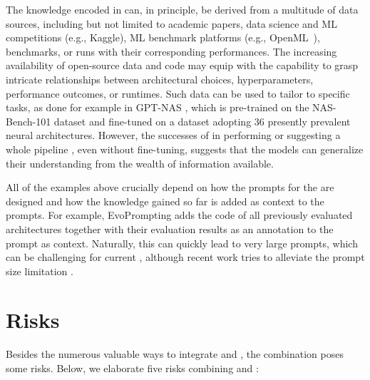 \documentclass[10pt]{article} %
\begin{document}
The knowledge encoded in \LLMs can, in principle, be derived from a multitude of data sources, including but not limited to academic papers, data science and ML competitions (e.g., Kaggle), ML benchmark platforms (e.g., OpenML~\citep{casalicchio-19a}), \AutoML benchmarks, or \AutoML runs with their corresponding performances.
The increasing availability of open-source data and code may equip \LLMs with the capability to grasp intricate relationships between architectural choices, hyperparameters, performance outcomes, or runtimes.
Such data can be used to tailor \LLMs to specific tasks, as done for example in GPT-NAS \citep{yu2023gptnas}, which is pre-trained on the NAS-Bench-101 dataset \citep{ying-icml19a} and fine-tuned on a dataset adopting 36 presently prevalent neural architectures. However, the successes of \LLMs in performing \NAS \citep{zheng2023gpt4} or suggesting a whole \AutoML pipeline \citep{zhang-arxiv23a, zhang-arxiv23b}, even without fine-tuning, suggests that the models can generalize their understanding from the wealth of information available.

All of the examples above crucially depend on how the prompts for the \LLM are designed and how the knowledge gained so far is added as context to the prompts. For example, EvoPrompting \citep{chen2023evoprompting} adds the code of all previously evaluated architectures together with their evaluation results as an annotation to the prompt as context. Naturally, this can quickly lead to very large prompts, which can be challenging for current \LLMs, although recent work tries to alleviate the prompt size limitation \citep{yu-arxiv23a}.

\section{Risks}
\label{sec:dangers-and-challenges}

Besides the numerous valuable ways to integrate \LLMs and \AutoML, the combination poses some risks. Below, we elaborate five risks combining \LLMs and \AutoML:
\end{document}
